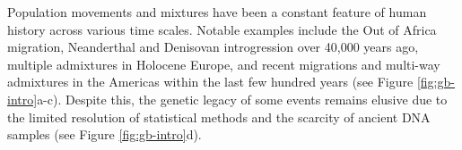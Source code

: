 




Population movements and mixtures have been a constant feature of human history across various time scales. Notable examples include the Out of Africa migration, Neanderthal and Denisovan introgression over 40,000 years ago, multiple admixtures in Holocene Europe, and recent migrations and multi-way admixtures in the Americas within the last few hundred years (see Figure \ref{fig:gb-intro}a-c). Despite this, the genetic legacy of some events remains elusive due to the limited resolution of statistical methods and the scarcity of ancient DNA samples (see Figure \ref{fig:gb-intro}d).

